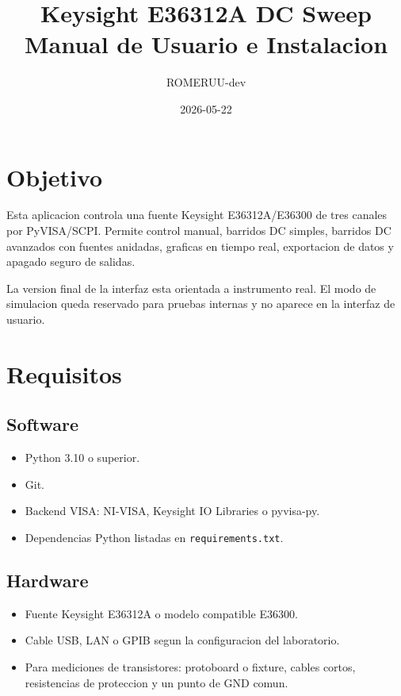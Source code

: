 \documentclass[11pt,letterpaper]{article}
\title{Keysight E36312A DC Sweep\\Manual de Usuario e Instalacion}
\author{ROMERUU-dev}
\date{2026-05-22}
\begin{document}
\maketitle
\tableofcontents
\newpage

\section{Objetivo}

Esta aplicacion controla una fuente Keysight E36312A/E36300 de tres canales por
PyVISA/SCPI. Permite control manual, barridos DC simples, barridos DC avanzados
con fuentes anidadas, graficas en tiempo real, exportacion de datos y apagado
seguro de salidas.

La version final de la interfaz esta orientada a instrumento real. El modo de
simulacion queda reservado para pruebas internas y no aparece en la interfaz de
usuario.

\section{Requisitos}

\subsection{Software}

\begin{itemize}
  \item Python 3.10 o superior.
  \item Git.
  \item Backend VISA: NI-VISA, Keysight IO Libraries o pyvisa-py.
  \item Dependencias Python listadas en \texttt{requirements.txt}.
\end{itemize}

\subsection{Hardware}

\begin{itemize}
  \item Fuente Keysight E36312A o modelo compatible E36300.
  \item Cable USB, LAN o GPIB segun la configuracion del laboratorio.
  \item Para mediciones de transistores: protoboard o fixture, cables cortos,
        resistencias de proteccion y un punto de GND comun.
\end{itemize}
\end{document}
